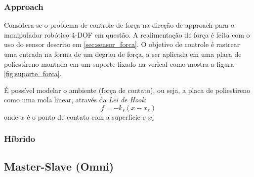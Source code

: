 \subsubsection{Approach}
Considera-se o problema de controle de força na direção de approach para o manipulador robótico 4-DOF em questão. A realimentação de força é feita com o uso do sensor descrito em \ref{sec:sensor_forca}. O objetivo de controle é rastrear uma entrada na forma de um degrau de força, a ser aplicada em uma placa de poliestireno montada em um suporte fixado na verical como mostra a figura \ref{fig:suporte_forca}.  

É possível modelar o ambiente (força de contato), ou seja, a placa de poliestireno como uma mola linear, através da \textit{Lei de Hook}: \cite{bib:toni}
\begin{equation}
f = -k_s (x - x_s)
\end{equation}
onde $x$ é o ponto de contato com a superfície e $x_s$
\subsubsection{Híbrido}
\subsection{Master-Slave (Omni)}
